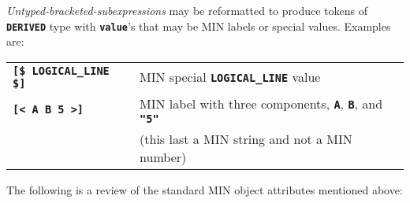 \documentclass[12pt]{article}
\newcommand{\TT}[1]{{\tt \bfseries #1}}
\begin{document}
{\em Untyped-bracketed-subexpressions} may be reformatted to
produce tokens of \TT{DERIVED} type with \TT{value}'s that may be
MIN labels or special values.  Examples are:
\begin{center}
\begin{tabular}{ll}
\TT{[\$ LOGICAL\_LINE \$]}	& MIN special \TT{LOGICAL\_LINE} value \\
\TT{[< A B 5 >]}	& MIN label with three components, \TT{A}, \TT{B},
			  and \TT{"5"} \\
			& (this last a MIN string and not a MIN number) \\
\end{tabular}
\end{center}

The following is a review of the standard MIN object attributes
mentioned above:
\end{document}
